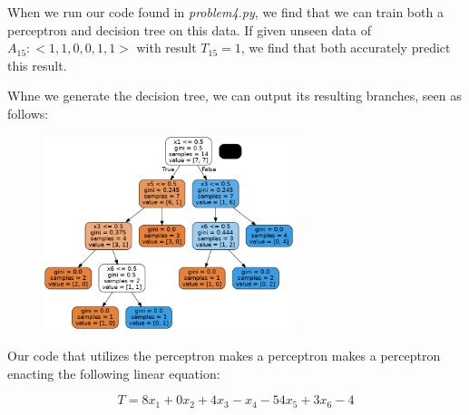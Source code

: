 \documentclass{article}
\begin{document}
When we run our code found in \textit{problem4.py}, we find that we can train both a perceptron and decision tree on this data. If given unseen data of $A_{15}:<1, 1, 0, 0, 1, 1>$ with result $T_{15}=1$, we find that both accurately predict this result.

Whne we generate the decision tree, we can output its resulting branches, seen as follows:

\begin{figure}[H]
    \centering
    \includegraphics[width = 0.65\textwidth]{tree.png}
\end{figure}

Our code that utilizes the perceptron makes a perceptron makes a perceptron enacting the following linear equation:

\begin{equation}
    T = 8x_1 + 0x_2 + 4x_3 - x_4 -5 4x_5 + 3x_6 - 4
\end{equation}
\end{document}
